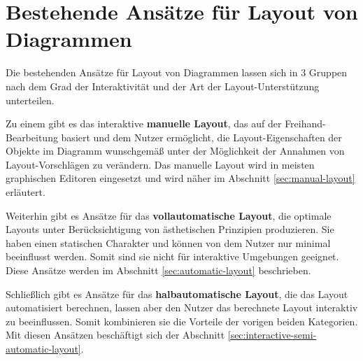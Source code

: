 
\chapter{Bestehende Ansätze für Layout von Diagrammen}

Die bestehenden Ansätze für Layout von Diagrammen lassen sich in 3 Gruppen nach dem Grad der Interaktivität und der Art der Layout-Unterstützung unterteilen.

Zu einem gibt es das interaktive \textbf{manuelle Layout}, das auf der Freihand-Bearbeitung basiert und dem Nutzer ermöglicht, die Layout-Eigenschaften der Objekte im Diagramm wunschgemäß unter der Möglichkeit der Annahmen von Layout-Vorschlägen zu verändern. Das manuelle Layout wird in meisten graphischen Editoren eingesetzt und wird näher im Abschnitt \ref{sec:manual-layout} erläutert.

Weiterhin gibt es Ansätze für das \textbf{vollautomatische Layout}, die optimale Layouts unter Berücksichtigung von ästhetischen Prinzipien produzieren. Sie haben einen statischen Charakter und können von dem Nutzer nur minimal beeinflusst werden. Somit sind sie nicht für interaktive Umgebungen geeignet. Diese Ansätze werden im Abschnitt \ref{sec:automatic-layout} beschrieben.

Schließlich gibt es Ansätze für das \textbf{halbautomatische Layout}, die das Layout automatisiert berechnen, lassen aber den Nutzer das berechnete Layout interaktiv zu beeinflussen. Somit kombinieren sie die Vorteile der vorigen beiden Kategorien. Mit diesen Ansätzen beschäftigt sich der Abschnitt \ref{sec:interactive-semi-automatic-layout}.





